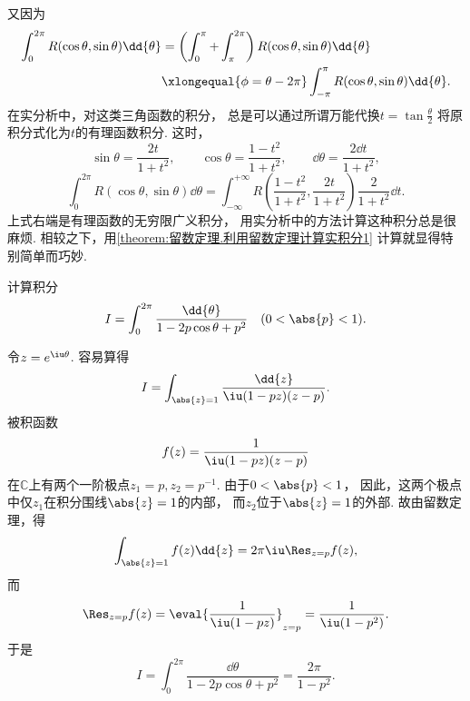 又因为\begin{align*}
	\int_0^{2\pi} R(\cos\theta,\sin\theta) \dd{\theta}
	&= \left( \int_0^\pi + \int_{\pi}^{2\pi} \right) R(\cos\theta,\sin\theta) \dd{\theta} \\
	&\xlongequal{\phi=\theta-2\pi} \int_{-\pi}^\pi R(\cos\theta,\sin\theta) \dd{\theta}.
\end{align*}
在实分析中，对这类三角函数的积分，
总是可以通过所谓万能代换\(t = \tan\frac{\theta}{2}\)
将原积分式化为\(t\)的有理函数积分.
这时，\begin{equation*}
	\sin\theta = \frac{2t}{1+t^2},
	\qquad
	\cos\theta = \frac{1-t^2}{1+t^2},
	\qquad
	\dd{\theta} = \frac{2 \dd{t}}{1+t^2},
\end{equation*}\begin{equation*}
	\int_0^{2\pi} R(\cos\theta,\sin\theta) \dd{\theta}
	= \int_{-\infty}^{+\infty} R\left(\frac{1-t^2}{1+t^2},\frac{2t}{1+t^2}\right) \frac{2}{1+t^2} \dd{t}.
\end{equation*}
上式右端是有理函数的无穷限广义积分，
用实分析中的方法计算这种积分总是很麻烦.
相较之下，用\cref{theorem:留数定理.利用留数定理计算实积分1} 计算就显得特别简单而巧妙.

\begin{example}[泊松积分]\label{example:留数定理.泊松积分}
计算积分\begin{equation*}
	I = \int_0^{2\pi} \frac{\dd{\theta}}{1-2p\cos\theta+p^2} \quad(0<\abs{p}<1).
\end{equation*}
\begin{solution}
令\(z=e^{\iu\theta}\).
容易算得\begin{equation*}
	I = \int_{\abs{z}=1} \frac{\dd{z}}{\iu(1-pz)(z-p)}.
\end{equation*}
被积函数\begin{equation*}
	f(z) = \frac{1}{\iu(1-pz)(z-p)}
\end{equation*}在\(\mathbb{C}\)上有两个一阶极点\(z_1=p, z_2=p^{-1}\).
由于\(0<\abs{p}<1\)，
因此，这两个极点中仅\(z_1\)在积分围线\(\abs{z}=1\)的内部，
而\(z_2\)位于\(\abs{z}=1\)的外部.
故由留数定理，得\begin{equation*}
	\int_{\abs{z}=1} f(z) \dd{z}
	= 2\pi\iu \Res_{z=p} f(z),
\end{equation*}而\begin{equation*}
	\Res_{z=p} f(z)
	= \eval{ \frac{1}{\iu(1-pz)} }_{z=p}
	= \frac{1}{\iu(1-p^2)}.
\end{equation*}
于是\begin{equation*}
	I = \int_0^{2\pi} \frac{\dd{\theta}}{1-2p\cos\theta+p^2}
	= \frac{2\pi}{1-p^2}.
\end{equation*}
\end{solution}
\end{example}

